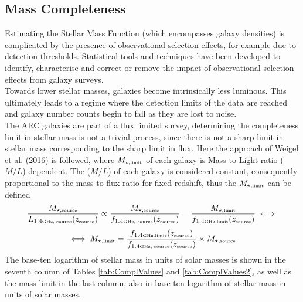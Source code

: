 \subsection{Mass Completeness} \label{subsec:Res/MassCompl}
Estimating the Stellar Mass Function (which encompasses galaxy densities) is complicated by the presence of observational selection effects, for example due to detection thresholds. Statistical tools and techniques have been developed to identify, characterise and correct or remove the impact of observational selection effects from galaxy surveys.\\
Towards lower stellar masses, galaxies become intrinsically less luminous. This ultimately leads to a regime where the detection limits of the data are reached and galaxy number counts begin to fall as they are lost to noise.\\ %
The ARC galaxies are part of a flux limited survey, determining the completeness limit in stellar mass is not a trivial process, since there is not a sharp limit in stellar mass corresponding to the sharp limit in flux\cite{Marches2009}. Here the approach of Weigel et al. (2016)\cite{Weigel2016} is followed, where $M_{\star, \mbox{\tiny{limit}}}$ of each galaxy is Mass-to-Light ratio ($M/L$) dependent. The ($M/L$) of each galaxy is considered constant, consequently proportional to the mass-to-flux ratio for fixed redshift, thus the $M_{\star, \mbox{\tiny{limit}}}$ can be defined
\begin{equation*}
    \dfrac{M_{\star,\mbox{\tiny{source}}}}{L_{1.4\mbox{\tiny{GHz, source}}}(z_{\mbox{\tiny{source}}})}  \propto \dfrac{M_{\star,\mbox{\tiny{source}}}}{f_{1.4\mbox{\tiny{GHz, source}}} (z_{\mbox{\tiny{source}}}) }  = \dfrac{M_{\star,\mbox{\tiny{limit}}}}{f_{1.4\mbox{\tiny{GHz,limit}}} (z_{\mbox{\tiny{source}}}) } \iff
\end{equation*}
\begin{equation}
    \iff M_{\star, \mbox{\tiny{limit}}} = \dfrac{f_{1.4\mbox{\tiny{GHz,limit}}} (z_{\mbox{\tiny{source}}})}{f_{1.4\mbox{\tiny{GHz, source}}} (z_{\mbox{\tiny{source}}})} \times M_{\star,\mbox{\tiny{source}}} \label{eq:MassCompl}
\end{equation}
The base-ten logarithm of stellar mass in units of solar masses is shown in the seventh column of Tables \ref{tab:ComplValues} and \ref{tab:ComplValues2}, as well as the mass limit in the last column, also in base-ten logarithm of stellar mass in units of solar masses.
